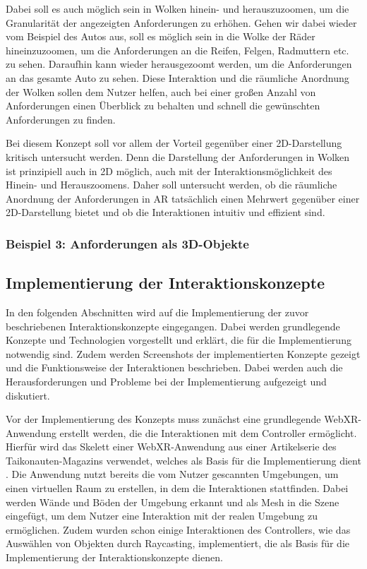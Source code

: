Dabei soll es auch möglich sein in Wolken hinein- und herauszuzoomen, um die Granularität der angezeigten Anforderungen zu erhöhen.
Gehen wir dabei wieder vom Beispiel des Autos aus, soll es möglich sein in die Wolke der Räder hineinzuzoomen, um die Anforderungen an die Reifen, Felgen, Radmuttern etc. zu sehen.
Daraufhin kann wieder herausgezoomt werden, um die Anforderungen an das gesamte Auto zu sehen.
Diese Interaktion und die räumliche Anordnung der Wolken sollen dem Nutzer helfen, auch bei einer großen Anzahl von Anforderungen einen Überblick zu behalten und schnell die gewünschten Anforderungen zu finden.

Bei diesem Konzept soll vor allem der Vorteil gegenüber einer 2D-Darstellung kritisch untersucht werden.
Denn die Darstellung der Anforderungen in Wolken ist prinzipiell auch in 2D möglich, auch mit der Interaktionsmöglichkeit des Hinein- und Herauszoomens.
Daher soll untersucht werden, ob die räumliche Anordnung der Anforderungen in AR tatsächlich einen Mehrwert gegenüber einer 2D-Darstellung bietet und ob die Interaktionen intuitiv und effizient sind.


\subsubsection{Beispiel 3: Anforderungen als 3D-Objekte}

\subsection{Implementierung der Interaktionskonzepte}

In den folgenden Abschnitten wird auf die Implementierung der zuvor beschriebenen Interaktionskonzepte eingegangen.
Dabei werden grundlegende Konzepte und Technologien vorgestellt und erklärt, die für die Implementierung notwendig sind.
Zudem werden Screenshots der implementierten Konzepte gezeigt und die Funktionsweise der Interaktionen beschrieben.
Dabei werden auch die Herausforderungen und Probleme bei der Implementierung aufgezeigt und diskutiert.

Vor der Implementierung des Konzepts muss zunächst eine grundlegende WebXR-Anwendung erstellt werden, die die Interaktionen mit dem Controller ermöglicht.
Hierfür wird das Skelett einer WebXR-Anwendung aus einer Artikelserie des Taikonauten-Magazins verwendet, welches als Basis für die Implementierung dient \autocite[][]{taikonauten-magazine}.
Die Anwendung nutzt bereits die vom Nutzer gescannten Umgebungen, um einen virtuellen Raum zu erstellen, in dem die Interaktionen stattfinden.
Dabei werden Wände und Böden der Umgebung erkannt und als Mesh in die Szene eingefügt, um dem Nutzer eine Interaktion mit der realen Umgebung zu ermöglichen.
Zudem wurden schon einige Interaktionen des Controllers, wie das Auswählen von Objekten durch Raycasting, implementiert, die als Basis für die Implementierung der Interaktionskonzepte dienen.



